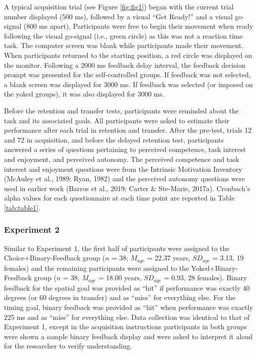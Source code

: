 \documentclass[
  doc, donotrepeattitle,floatsintext]{apa7}
\begin{document}
A typical acquisition trial (see Figure \ref{fig:fig1}) began with the current trial number displayed (500 ms), followed by a visual ``Get Ready!'' and a visual go-signal (800 ms apart). Participants were free to begin their movement when ready following the visual go-signal (i.e., green circle) as this was not a reaction time task. The computer screen was blank while participants made their movement. When participants returned to the starting position, a red circle was displayed on the monitor. Following a 2000 ms feedback delay interval, the feedback decision prompt was presented for the self-controlled groups. If feedback was not selected, a blank screen was displayed for 3000 ms. If feedback was selected (or imposed on the yoked groups), it was also displayed for 3000 ms.

Before the retention and transfer tests, participants were reminded about the task and its associated goals. All participants were asked to estimate their performance after each trial in retention and transfer. After the pre-test, trials 12 and 72 in acquisition, and before the delayed retention test, participants answered a series of questions pertaining to perceived competence, task interest and enjoyment, and perceived autonomy. The perceived competence and task interest and enjoyment questions were from the Intrinsic Motivation Inventory (McAuley et al., 1989; Ryan, 1982) and the perceived autonomy questions were used in earlier work (Barros et al., 2019; Carter \& Ste-Marie, 2017a). Cronbach's alpha values for each questionnaire at each time point are reported in Table \ref{tab:table1}.

\hypertarget{experiment-2-1}{%
\subsubsection{Experiment 2}\label{experiment-2-1}}

Similar to Experiment 1, the first half of participants were assigned to the Choice+Binary-Feedback group (\(n\) = 38; \(M_{age}\) = 22.37 years, \(SD_{age}\) = 3.13, 19 females) and the remaining participants were assigned to the Yoked+Binary-Feedback group (\(n\) = 38; \(M_{age}\) = 18.00 years, \(SD_{age}\) = 0.93, 28 females). Binary feedback for the spatial goal was provided as ``hit'' if performance was exactly 40 degrees (or 60 degrees in transfer) and as ``miss'' for everything else. For the timing goal, binary feedback was provided as ``hit'' when performance was exactly 225 ms and as ``miss'' for everything else. Data collection was identical to that of Experiment 1, except in the acquisition instructions participants in both groups were shown a sample binary feedback display and were asked to interpret it aloud for the researcher to verify understanding.
\end{document}
